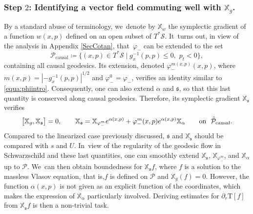 \documentclass[10pt]{amsart}
\theoremstyle{plain}
\theoremstyle{definition}
\newcommand\T{{\mathbb{X}}}
\begin{document}
\subsubsection{Step $2$: Identifying a vector field commuting well with $\T_g$.}\label{Subsubsecstart} By a standard abuse of terminology, we~denote by $\T_w$ the symplectic gradient of a function $w(x,p)$ defined on an open subset of $T^* \mathcal{S}$. It~turns out, in view of the analysis in Appendix \ref{SecCotan}, that~$\varphi_-$ can be extended to the set
\[
\mathcal{P}_{\mathrm{causal}}\coloneqq \bigl\{ (x,p) \in T^* \mathcal{S} \mid g^{-1}_x(p,p) \leq 0, \, \,p_t <0 \bigr\},
\]
containing all causal geodesics. Its extension, denoted $\varphi_-^{m(x,p)}(x,p)$, where $m(x,p)=|-g_x^{-1}(p,p)|^{1/2}$ and $\varphi_-^0=\varphi_-$, verifies an identity similar to \eqref{equa:phiintro}. Consequently, one can also extend $\alpha$ and $\mathfrak{s}$, so that this last quantity is conserved along causal geodesics. Therefore, its symplectic gradient $\T_{\mathfrak{s}}$ verifies
\[
\bigl[ \T_g, \T_{\mathfrak{s}} \bigr]=0, \qquad \T_{\mathfrak{s}}=\T_{\varphi_-^m} e^{\alpha(x,p)}+ \varphi_-^m (x,p) e^{\alpha(x,p)} \T_\alpha \qquad \text{on\,\, $\accentset{\circ}{\mathcal{P}}_{\mathrm{causal}}$.}
\]
Compared to the linearized case previously discussed, $\mathfrak{s}$ and $\T_{\mathfrak{s}}$ should be compared with $s$ and $U$. In~view of the regularity of the geodesic flow in Schwarzschild and these last quantities, one can smoothly extend $\T_{\mathfrak{s}}$, $\T_{\varphi_-^m}$, and $\T_\alpha$ up to $\mathcal{P}$. We~can then obtain boundedness for $\T_{\mathfrak{s}} f$, where $f$ is a solution to the massless Vlasov equation, that is,$f$ is defined on $\mathcal{P}$ and $\T_g (f)=0$. However, the function $\alpha(x,p)$ is not given as an explicit function of the coordinates, which makes the expression of $\T_\alpha$ particularly involved. Deriving estimates for $\partial_r \mathrm{T}[f]$ from $\T_{\mathfrak{s}} f$ is then a non-trivial task.
\end{document}
